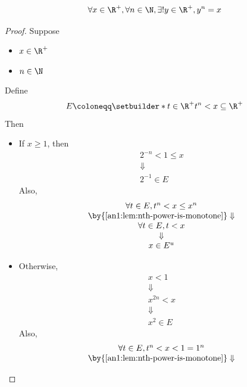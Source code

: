 \begin{theorem} \label{an1:thm:existence-and-uniqueness-of-nth-roots}
  \[
    \forall x \in \R^{+}, \forall n \in \N, \exists! y \in \R^{+}, y^{n} = x
  \]
\end{theorem}

\begin{proof}
  Suppose
  \begin{itemize}
    \item $x \in \R^{+}$
    \item $n \in \N$
  \end{itemize}
  Define
  \[
    E \coloneqq \setbuilder*{t \in \R^{+}}{t^{n} < x} \subseteq \R^{+}
  \]
  Then
  \begin{itemize}
    \item If $x \geq 1$, then
          \[
            \begin{array}{c}
              2^{-n} < 1 \leq x \\
              \Downarrow        \\
              2^{-1} \in E
            \end{array}
          \]
          Also,
          \[
            \begin{array}{c}
              \forall t \in E, t^{n} < x \leq x^{n}                \\
              \by{\Cref{an1:lem:nth-power-is-monotone}} \Downarrow \\
              \forall t \in E, t < x                               \\
              \Downarrow                                           \\
              x \in E^{u}
            \end{array}
          \]
    \item Otherwise,
          \[
            \begin{array}{c}
              x < 1      \\
              \Downarrow \\
              x^{2n} < x \\
              \Downarrow \\
              x^{2} \in E
            \end{array}
          \]
          Also,
          \[
            \begin{array}{c}
              \forall t \in E, t^{n} < x < 1 = 1^{n}               \\
              \by{\Cref{an1:lem:nth-power-is-monotone}} \Downarrow \\

\end{array}\]
\end{itemize}
\end{proof}
